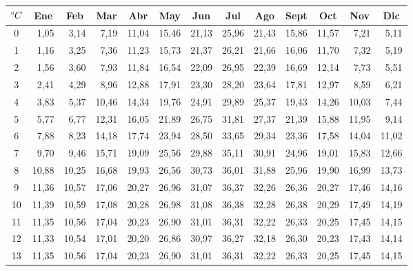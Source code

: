 \begin{table}[H]
\centering
\begin{tabular}{|c|r|r|r|r|r|r|r|r|r|r|r|r|}
\hline
$\degree C$ &
  \multicolumn{1}{c|}{Ene} &
  \multicolumn{1}{c|}{Feb} &
  \multicolumn{1}{c|}{Mar} &
  \multicolumn{1}{c|}{Abr} &
  \multicolumn{1}{c|}{May} &
  \multicolumn{1}{c|}{Jun} &
  \multicolumn{1}{c|}{Jul} &
  \multicolumn{1}{c|}{Ago} &
  \multicolumn{1}{c|}{Sept} &
  \multicolumn{1}{c|}{Oct} &
  \multicolumn{1}{c|}{Nov} &
  \multicolumn{1}{c|}{Dic} \\ \hline
0  & 1,05  & 3,14  & 7,19  & 11,04 & 15,46 & 21,13 & 25,96 & 21,43 & 15,86 & 11,57 & 7,21  & 5,11  \\ \hline
1  & 1,16  & 3,25  & 7,36  & 11,23 & 15,73 & 21,37 & 26,21 & 21,66 & 16,06 & 11,70 & 7,32  & 5,19  \\ \hline
2  & 1,56  & 3,60  & 7,93  & 11,84 & 16,54 & 22,09 & 26,95 & 22,39 & 16,69 & 12,14 & 7,73  & 5,51  \\ \hline
3  & 2,41  & 4,29  & 8,96  & 12,88 & 17,91 & 23,30 & 28,20 & 23,64 & 17,81 & 12,97 & 8,59  & 6,21  \\ \hline
4  & 3,83  & 5,37  & 10,46 & 14,34 & 19,76 & 24,91 & 29,89 & 25,37 & 19,43 & 14,26 & 10,03 & 7,44  \\ \hline
5  & 5,77  & 6,77  & 12,31 & 16,05 & 21,89 & 26,75 & 31,81 & 27,37 & 21,39 & 15,88 & 11,95 & 9,14  \\ \hline
6  & 7,88  & 8,23  & 14,18 & 17,74 & 23,94 & 28,50 & 33,65 & 29,34 & 23,36 & 17,58 & 14,04 & 11,02 \\ \hline
7  & 9,70  & 9,46  & 15,71 & 19,09 & 25,56 & 29,88 & 35,11 & 30,91 & 24,96 & 19,01 & 15,83 & 12,66 \\ \hline
8  & 10,88 & 10,25 & 16,68 & 19,93 & 26,56 & 30,73 & 36,01 & 31,88 & 25,96 & 19,90 & 16,99 & 13,73 \\ \hline
9  & 11,36 & 10,57 & 17,06 & 20,27 & 26,96 & 31,07 & 36,37 & 32,26 & 26,36 & 20,27 & 17,46 & 14,16 \\ \hline
10 & 11,39 & 10,59 & 17,08 & 20,28 & 26,98 & 31,08 & 36,38 & 32,28 & 26,38 & 20,29 & 17,49 & 14,19 \\ \hline
11 & 11,35 & 10,56 & 17,04 & 20,23 & 26,90 & 31,01 & 36,31 & 32,22 & 26,33 & 20,25 & 17,45 & 14,15 \\ \hline
12 & 11,33 & 10,54 & 17,01 & 20,20 & 26,86 & 30,97 & 36,27 & 32,18 & 26,30 & 20,23 & 17,43 & 14,14 \\ \hline
13 & 11,35 & 10,56 & 17,04 & 20,23 & 26,90 & 31,01 & 36,31 & 32,22 & 26,33 & 20,25 & 17,45 & 14,15 \\ \hline

\end{tabular}
\end{table}
